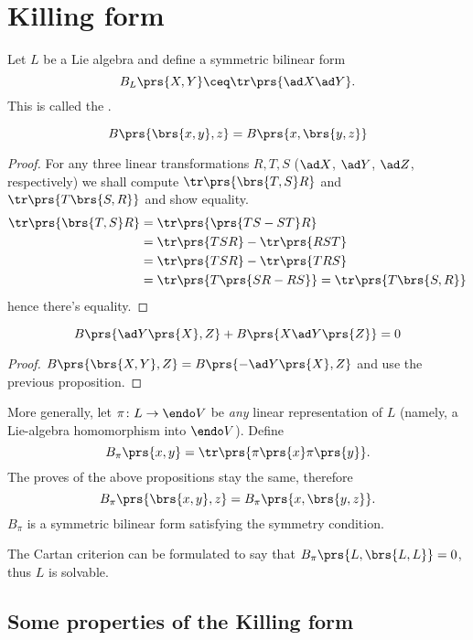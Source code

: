 \documentclass[10pt,a4paper,twoside,openany,hidelinks]{book}
\begin{document}
\chapter{Killing form}

Let $L$ be a Lie algebra and define a symmetric bilinear form
\[B_L\prs{X,Y} \ceq \tr \prs{\ad X \ad Y}\text{.}\]
This is called the .

\begin{proposition}
\[B\prs{\brs{x,y},z} = B\prs{x,\brs{y,z}}\]
\end{proposition}
\begin{proof}
For any three linear transformations $R,T,S$ ($\ad X$, $\ad Y$, $\ad Z$, respectively) we shall compute $\tr \prs{\brs{T,S} R}$ and $\tr \prs{T \brs{S,R}}$ and show equality.
\begin{align*}
\tr \prs{\brs{T,S} R} &= \tr \prs{\prs{TS - ST}R} \\&=
\tr \prs{TSR} - \tr \prs{RST} \\&=
\tr\prs{TSR} - \tr\prs{TRS} \\&=
\tr\prs{T \prs{SR -RS}} = \tr\prs{T \brs{S,R}}
\end{align*}
hence
there's equality.
\end{proof}
\begin{proposition}
\[B\prs{\ad Y\prs{X}, Z} + B\prs{X \ad Y\prs{Z}} = 0\]
\end{proposition}
\begin{proof}
$B\prs{\brs{X,Y},Z} = B\prs{-\ad Y\prs{X} , Z}$ and use the previous proposition.
\end{proof}

More generally, let $\pi \colon L \to \endo V$ be \emph{any} linear representation of $L$ (namely, a Lie-algebra homomorphism into $\endo V$).
Define \[B_{\pi}\prs{x,y} = \tr \prs{\pi\prs{x}\pi\prs{y}} \text{.}\]
The proves of the above propositions stay the same, therefore
\[B_{\pi} \prs{\brs{x,y},z} = B_{\pi}\prs{x, \brs{y,z}} \text{.}\]
$B_{\pi}$ is a symmetric bilinear form satisfying the symmetry condition.

\begin{conclusion}
The Cartan criterion can be formulated to say that $B_{\pi}\prs{L,\brs{L,L}} = 0$, thus $L$ is solvable.
\end{conclusion}

\section{Some properties of the Killing form}
\end{document}
